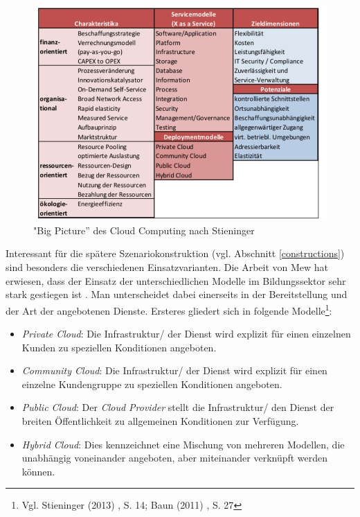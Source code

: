 \begin{figure}
	\centering
	\includegraphics[width=\linewidth]{images/bigpicture}
	\caption[Caption for parameters]{ "Big Picture'' des Cloud Computing nach Stieninger \cite{stieninger}}
	\label{fig:bigpicture}
\end{figure}

Interessant für die spätere Szenariokonstruktion (vgl. Abschnitt \ref{constructions}) sind besonders die verschiedenen Einsatzvarianten. Die Arbeit von Mew hat erwiesen, dass der Einsatz der unterschiedlichen Modelle im Bildungssektor sehr stark gestiegen ist \cite{mew}. Man unterscheidet dabei einerseits in der Bereitstellung und der Art der angebotenen Dienste. Ersteres gliedert sich in folgende Modelle\footnote{Vgl. Stieninger (2013) \cite{stieninger}, S. 14; Baun (2011) \cite{baun}, S. 27}:
\begin{itemize}
	\item \textit{Private Cloud}: Die Infrastruktur/ der Dienst wird explizit für einen einzelnen Kunden zu speziellen Konditionen angeboten.
	\item \textit{Community Cloud}: Die Infrastruktur/ der Dienst wird explizit für einen einzelne Kundengruppe zu speziellen Konditionen angeboten.
	\item \textit{Public Cloud}: Der \textit{Cloud Provider} stellt die Infrastruktur/ den Dienst der breiten Öffentlichkeit zu allgemeinen Konditionen zur Verfügung.
	\item \textit{Hybrid Cloud}: Dies kennzeichnet eine Mischung von mehreren Modellen, die unabhängig voneinander angeboten, aber miteinander verknüpft werden können.
\end{itemize}

